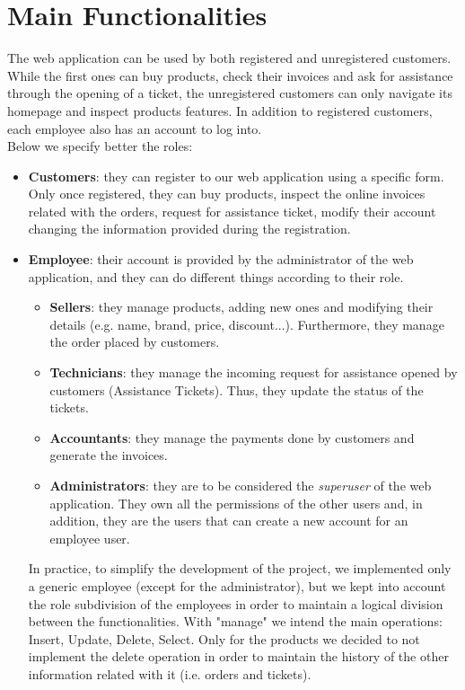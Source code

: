 \section{Main Functionalities}

The web application can be used by both registered and unregistered customers. While the first ones can buy products, check their invoices and ask for assistance through the opening of a ticket, the unregistered customers can only navigate its homepage and inspect products features. In addition to registered customers, each employee also has an account to log into.
\\
Below we specify better the roles:
\begin{itemize}
    \item \textbf{Customers}: they can register to our web application using a specific form. Only once registered, they can buy products, inspect the online invoices related with the orders, request for assistance ticket, modify their account changing the information provided during the registration.
    \item \textbf{Employee}: their account is provided by the administrator of the web application, and they can do different things according to their role.
    \begin{itemize}
        \item \textbf{Sellers}: they manage products, adding new ones and modifying  their details (e.g. name, brand, price, discount...). Furthermore, they manage the order placed by customers.
        \item \textbf{Technicians}: they manage the incoming request for assistance opened by customers (Assistance Tickets). Thus, they update the status of the tickets.
        \item \textbf{Accountants}: they manage the payments done by customers and generate the invoices.
        \item \textbf{Administrators}: they are to be considered the \textit{superuser} of the web application. They own all the permissions of the other users and, in addition, they are the users that can create a new account for an employee user.
    \end{itemize}
    In practice, to simplify the development of the project, we implemented only a generic employee (except for the administrator), but we kept into account the role subdivision of the employees in order to maintain a logical division between the functionalities.
    With "manage" we intend the main operations: Insert, Update, Delete, Select. Only for the products  we decided to not implement the delete operation in order to maintain the history of the other information related with it (i.e. orders and tickets).
\end{itemize}